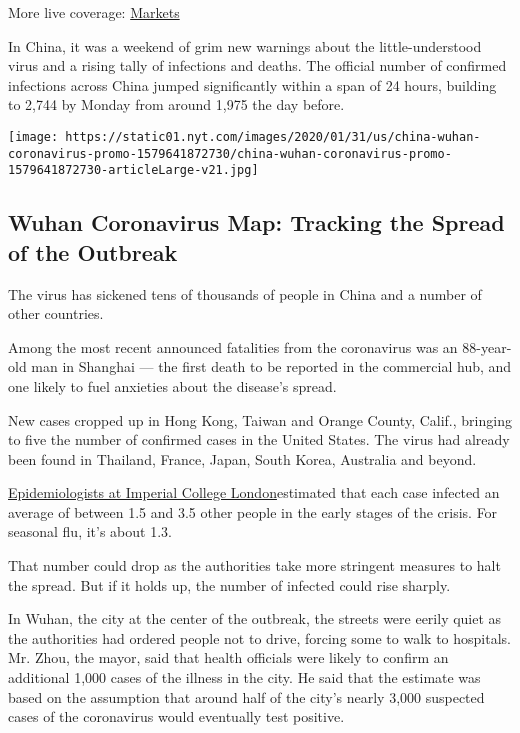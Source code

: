 More live coverage:
\href{https://www.nytimes.com/live/2020/07/31/business/stock-market-today-coronavirus?action=click\&pgtype=Article\&state=default\&region=MAIN_CONTENT_1\&context=storylines_live_updates}{Markets}

In China, it was a weekend of grim new warnings about the
little-understood virus and a rising tally of infections and deaths. The
official number of confirmed infections across China jumped
significantly within a span of 24 hours, building to 2,744 by Monday
from around 1,975 the day before.

\href{https://www.nytimes.com/interactive/2020/01/21/world/asia/china-coronavirus-maps.html}{}

\texttt{[image: https://static01.nyt.com/images/2020/01/31/us/china-wuhan-coronavirus-promo-1579641872730/china-wuhan-coronavirus-promo-1579641872730-articleLarge-v21.jpg]}

\hypertarget{wuhan-coronavirus-map-tracking-the-spread-of-the-outbreak}{%
\subsection{Wuhan Coronavirus Map: Tracking the Spread of the
Outbreak}\label{wuhan-coronavirus-map-tracking-the-spread-of-the-outbreak}}

The virus has sickened tens of thousands of people in China and a number
of other countries.

Among the most recent announced fatalities from the coronavirus was an
88-year-old man in Shanghai --- the first death to be reported in the
commercial hub, and one likely to fuel anxieties about the disease's
spread.

New cases cropped up in Hong Kong, Taiwan and Orange County, Calif.,
bringing to five the number of confirmed cases in the United States. The
virus had already been found in Thailand, France, Japan, South Korea,
Australia and beyond.

\href{https://www.imperial.ac.uk/mrc-global-infectious-disease-analysis/news--wuhan-coronavirus/}{Epidemiologists
at Imperial College London}estimated that each case infected an average
of between 1.5 and 3.5 other people in the early stages of the crisis.
For seasonal flu, it's about 1.3.

That number could drop as the authorities take more stringent measures
to halt the spread. But if it holds up, the number of infected could
rise sharply.

In Wuhan, the city at the center of the outbreak, the streets were
eerily quiet as the authorities had ordered people not to drive, forcing
some to walk to hospitals. Mr. Zhou, the mayor, said that health
officials were likely to confirm an additional 1,000 cases of the
illness in the city. He said that the estimate was based on the
assumption that around half of the city's nearly 3,000 suspected cases
of the coronavirus would eventually test positive.

